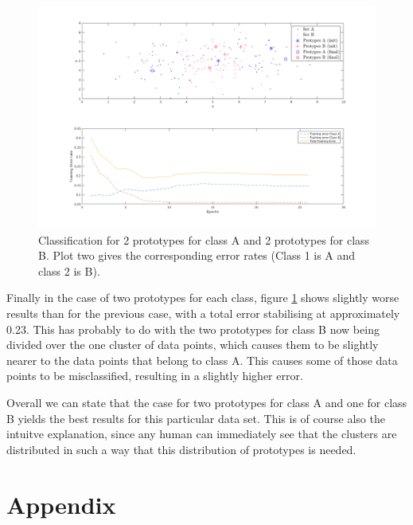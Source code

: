 \documentclass[10pt]{article}
\begin{document}
\begin{figure}[H]
 \centering
 \includegraphics[width=\textwidth]{Fig12_d.png}
 \caption{Classification for 2 prototypes for class A and 2 prototypes for class B. Plot two gives the corresponding error rates (Class 1 is A and class 2 is B).}
 \label{fig1.12d}
\end{figure}
Finally in the case of two prototypes for each class, figure \ref{fig1.12d} shows slightly worse results than for the previous case, with a total error stabilising at approximately 0.23. This has probably to do with the two prototypes for class B now being divided over the one cluster of data points, which causes them to be slightly nearer to the data points that belong to class A. This causes some of those data points to be misclassified, resulting in a slightly higher error.

\bigskip
\noindent Overall we can state that the case for two prototypes for class A and one for class B yields the best results for this particular data set. This is of course also the intuitve explanation, since any human can immediately see that the clusters are distributed in such a way that this distribution of prototypes is needed.


\section*{Appendix}




\maketitle
\end{document}
